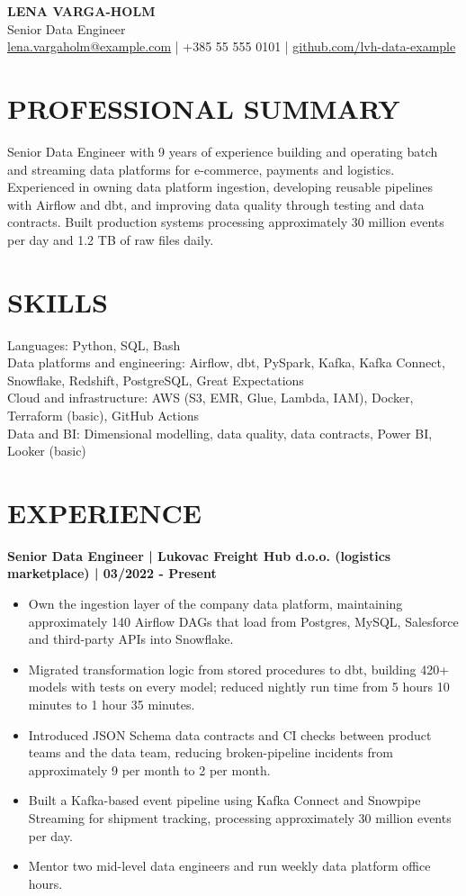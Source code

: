 \documentclass[11pt,a4paper]{article}
\begin{document}
\begin{center}
{\Huge\bfseries\color{primarycolor} LENA VARGA-HOLM}\\[0.35em]
{\large\color{accentcolor} Senior Data Engineer}\\[0.25em]
\small \href{mailto:lena.vargaholm@example.com}{lena.vargaholm@example.com} | +385 55 555 0101 | \href{https://github.com/lvh-data-example}{github.com/lvh-data-example}
\end{center}

\section*{PROFESSIONAL SUMMARY}
Senior Data Engineer with 9 years of experience building and operating batch and streaming data platforms for e-commerce, payments and logistics. Experienced in owning data platform ingestion, developing reusable pipelines with Airflow and dbt, and improving data quality through testing and data contracts. Built production systems processing approximately 30 million events per day and 1.2 TB of raw files daily.

\section*{SKILLS}
Languages: Python, SQL, Bash\\
Data platforms and engineering: Airflow, dbt, PySpark, Kafka, Kafka Connect, Snowflake, Redshift, PostgreSQL, Great Expectations\\
Cloud and infrastructure: AWS (S3, EMR, Glue, Lambda, IAM), Docker, Terraform (basic), GitHub Actions\\
Data and BI: Dimensional modelling, data quality, data contracts, Power BI, Looker (basic)

\section*{EXPERIENCE}
\textbf{Senior Data Engineer | Lukovac Freight Hub d.o.o. (logistics marketplace) | 03/2022 - Present}
\begin{itemize}
\item Own the ingestion layer of the company data platform, maintaining approximately 140 Airflow DAGs that load from Postgres, MySQL, Salesforce and third-party APIs into Snowflake.
\item Migrated transformation logic from stored procedures to dbt, building 420+ models with tests on every model; reduced nightly run time from 5 hours 10 minutes to 1 hour 35 minutes.
\item Introduced JSON Schema data contracts and CI checks between product teams and the data team, reducing broken-pipeline incidents from approximately 9 per month to 2 per month.
\item Built a Kafka-based event pipeline using Kafka Connect and Snowpipe Streaming for shipment tracking, processing approximately 30 million events per day.
\item Mentor two mid-level data engineers and run weekly data platform office hours.
\end{itemize}
\end{document}
